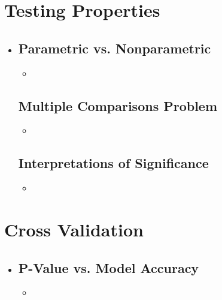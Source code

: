 \section{Testing Properties}
\begin{itemize}
  \item []

  \subsection{Parametric vs. Nonparametric}
  \begin{itemize}
    \item 
  \end{itemize}

  \subsection{Multiple Comparisons Problem}
  \begin{itemize}
    \item 
  \end{itemize}
  
  \subsection{Interpretations of Significance}
  \begin{itemize}
    \item 
  \end{itemize}
  
\end{itemize}

\section{Cross Validation}
\begin{itemize}
  \item []

  \subsection{P-Value vs. Model Accuracy}
  \begin{itemize}
    \item 
  \end{itemize}
  
\end{itemize}

